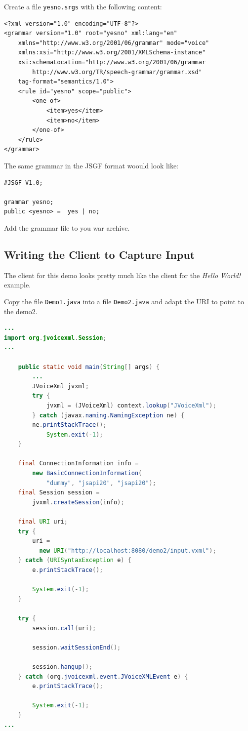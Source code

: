 \documentclass[11pt,a4paper]{book}
\begin{document}
Create a file \texttt{yesno.srgs} with the following content:

\begin{lstlisting}
<?xml version="1.0" encoding="UTF-8"?>
<grammar version="1.0" root="yesno" xml:lang="en"
    xmlns="http://www.w3.org/2001/06/grammar" mode="voice"
    xmlns:xsi="http://www.w3.org/2001/XMLSchema-instance"
    xsi:schemaLocation="http://www.w3.org/2001/06/grammar
        http://www.w3.org/TR/speech-grammar/grammar.xsd"
    tag-format="semantics/1.0">
    <rule id="yesno" scope="public">
        <one-of>
            <item>yes</item>
            <item>no</item>
        </one-of>
    </rule>
</grammar>
\end{lstlisting}

The same grammar in the JSGF format woould look like:

\begin{lstlisting}
#JSGF V1.0;

grammar yesno;
public <yesno> =  yes | no;
\end{lstlisting}

Add the grammar file to you war archive.

\subsection{Writing the Client to Capture Input}

The client for this demo looks pretty much like the client for the \emph{Hello
World!} example.

Copy the file \texttt{Demo1.java} into a file \texttt{Demo2.java} and adapt the
URI to point to the demo2.

\begin{lstlisting}[language=Java]
...
import org.jvoicexml.Session;
...

    public static void main(String[] args) {
        ...
        JVoiceXml jvxml;
        try {
            jvxml = (JVoiceXml) context.lookup("JVoiceXml");
        } catch (javax.naming.NamingException ne) {
	    ne.printStackTrace();
            System.exit(-1);
    }

    final ConnectionInformation info =
        new BasicConnectionInformation(
            "dummy", "jsapi20", "jsapi20");
    final Session session = 
        jvxml.createSession(info);

    final URI uri;
    try {
        uri = 
          new URI("http://localhost:8080/demo2/input.vxml");
    } catch (URISyntaxException e) {
        e.printStackTrace();

        System.exit(-1);
    }

    try {
        session.call(uri);

        session.waitSessionEnd();

        session.hangup();
    } catch (org.jvoicexml.event.JVoiceXMLEvent e) {
        e.printStackTrace();

        System.exit(-1);
    }
...
\end{lstlisting}
\end{document}
